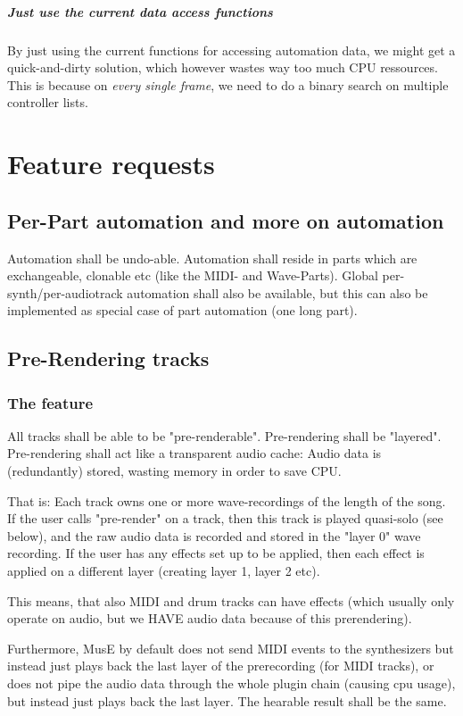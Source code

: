 \documentclass[a4paper]{report}
\begin{document}
\paragraph{Just use the current data access functions}
By just using the current functions for accessing automation data,
we might get a quick-and-dirty solution, which however wastes way too
much CPU ressources. This is because on \emph{every single frame}, we
need to do a binary search on multiple controller lists.


\chapter{Feature requests}
\section{Per-Part automation and more on automation}                       %
Automation shall be undo-able. Automation shall reside in parts which
are exchangeable, clonable etc (like the MIDI- and Wave-Parts).
Global per-synth/per-audiotrack automation shall also be available, but
this can also be implemented as special case of part automation (one
long part).

\section{Pre-Rendering tracks}
\subsection{The feature}
All tracks shall be able to be "pre-renderable". Pre-rendering shall
be "layered". Pre-rendering shall act like a transparent audio cache:
Audio data is (redundantly) stored, wasting memory in order to save CPU.

That is: Each track owns one or more wave-recordings of the length of
the song. If the user calls "pre-render" on a track, then this track
is played quasi-solo (see below), and the raw audio data is recorded
and stored in the "layer 0" wave recording. If the user has any effects
set up to be applied, then each effect is applied on a different layer
(creating layer 1, layer 2 etc).

This means, that also MIDI and drum tracks can have effects (which
usually only operate on audio, but we HAVE audio data because of this
prerendering).

Furthermore, MusE by default does not send MIDI events to the synthesizers
but instead just plays back the last layer of the prerecording (for
MIDI tracks), or does not pipe the audio data through the whole plugin
chain (causing cpu usage), but instead just plays back the last layer.
The hearable result shall be the same.
\end{document}
